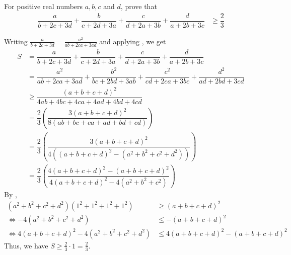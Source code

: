 \documentclass{subfile}
\begin{document}
		\begin{problem}
			For positive real numbers $a,b,c$ and $d$, prove that
				\begin{align*}
					\dfrac{a}{b+2c+3d}+\dfrac{b}{c+2d+3a}+\dfrac{c}{d+2a+3b}+\dfrac{d}{a+2b+3c}
						& \geq \dfrac{2}{3}
				\end{align*}
			
				\begin{solution}
					Writing $\frac{a}{b+2c+3d}=\frac{a^{2}}{ab+2ca+3ad}$ and applying , we get
						\begin{align*}
							S
								& = \dfrac{a}{b+2c+3d}+\dfrac{b}{c+2d+3a}+\dfrac{c}{d+2a+3b}+\dfrac{d}{a+2b+3c}\\
								& = \dfrac{a^{2}}{ab+2ca+3ad}+\dfrac{b^{2}}{bc+2bd+3ab}+\dfrac{c^{2}}{cd+2ca+3bc}+\dfrac{d^{2}}{ad+2bd+3cd}\\
								& \geq \dfrac{(a+b+c+d)^{2}}{4ab+4bc+4ca+4ad+4bd+4cd}\\
								& = \dfrac{2}{3}\left(\dfrac{3(a+b+c+d)^{2}}{8(ab+bc+ca+ad+bd+cd)}\right)\\
								& = \dfrac{2}{3}\left(\dfrac{3(a+b+c+d)^{2}}{4\left((a+b+c+d)^{2}-(a^{2}+b^{2}+c^{2}+d^{2})\right)}\right)\\
								& = \dfrac{2}{3}\left(\dfrac{4(a+b+c+d)^{2}-(a+b+c+d)^{2}}{4(a+b+c+d)^{2}-4(a^{2}+b^{2}+c^{2})}\right)
						\end{align*}
					By ,
						\begin{align*}
							(a^{2}+b^{2}+c^{2}+d^{2})(1^{2}+1^{2}+1^{2}+1^{2})
								& \geq (a+b+c+d)^{2}\\
							\iff -4(a^{2}+b^{2}+c^{2}+d^{2})
								& \leq -(a+b+c+d)^{2}\\
							\iff 4(a+b+c+d)^{2}-4(a^{2}+b^{2}+c^{2}+d^{2})
								& \leq 4(a+b+c+d)^{2}-(a+b+c+d)^{2}
						\end{align*}
					Thus, we have $S\geq \frac{2}{3}\cdot1=\frac{2}{3}$.
				\end{solution}
		\end{problem}
	
\end{document}
